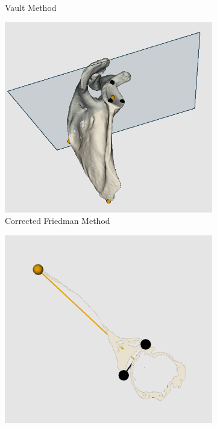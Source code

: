 \begin{figure}
\begin{center}
\begin{subfigure}[b]{0.31\linewidth}
			\caption{\label{fig:visvault}Vault Method}
		\end{subfigure}	
	\end{center}
	    \begin{center}
                \begin{subfigure}[b]{0.30\linewidth}
			\includegraphics[width=\linewidth]{figures/corr_fried_vis.png}
			\caption{\label{fig:viscorrfried}Corrected Friedman Method}
		\end{subfigure}	
                \begin{subfigure}[b]{0.31\linewidth}
			\includegraphics[width=\linewidth]{figures/friedman_vis2D.png}

\end{subfigure}
\end{center}
\end{figure}
